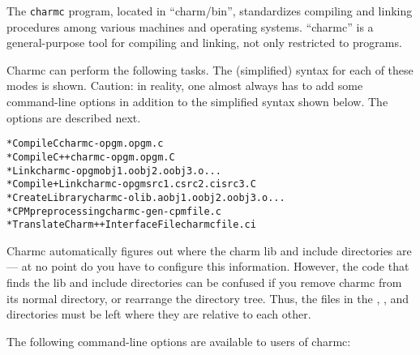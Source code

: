 The {\tt charmc} program, located in ``charm/bin'', standardizes 
compiling and linking procedures
among various machines and operating systems.  ``charmc'' is
a general-purpose tool for compiling and
linking, not only restricted to \charmpp{} programs.

Charmc can perform the following tasks.  The (simplified) syntax for
each of these modes is shown.  Caution: in reality, one almost always
has to add some command-line options in addition to the simplified
syntax shown below.  The options are described next.

\begin{alltt}
 * Compile C                        charmc -o pgm.o pgm.c
 * Compile C++                      charmc -o pgm.o pgm.C
 * Link                             charmc -o pgm   obj1.o obj2.o obj3.o...
 * Compile + Link                   charmc -o pgm   src1.c src2.ci src3.C
 * Create Library                   charmc -o lib.a obj1.o obj2.o obj3.o...
 * CPM preprocessing                charmc -gen-cpm file.c
 * Translate Charm++ Interface File charmc file.ci
\end{alltt}

Charmc automatically figures out where the charm lib and include
directories are --- at no point do you have to configure this
information.  However, the code that finds the lib and include
directories can be confused if you remove charmc from its normal
directory, or rearrange the directory tree.  Thus, the files in the
, , and  directories 
must be left where they are relative to each other.  

The following command-line options are available to users of charmc:

